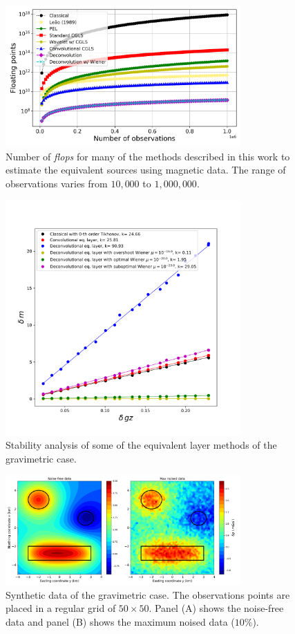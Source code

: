 \begin{figure}[htbp]
	\begin{center}
		\includegraphics[width=9cm]{Fig/flops_mag}%
	\end{center}
	\caption{Number of \textit{flops} for many of the methods described in this work to estimate the equivalent sources using magnetic data. The range of observations varies from $10,000$ to $1,000,000$.}
	\label{fig:2}
\end{figure}

\begin{figure}[htbp]
	\begin{center}
		\includegraphics[width=9cm]{Fig/stability_grav}
	\end{center}
	\caption{Stability analysis of some of the equivalent layer methods of the gravimetric case.}
	\label{fig:3}
\end{figure}

\begin{figure}[htbp]
	\begin{center}
		\includegraphics[width=9cm]{Fig/synthetic_grav}
	\end{center}
	\caption{Synthetic data of the gravimetric case. The observations points are placed in a regular grid of $50 \times 50$. Panel (A) shows the noise-free data and panel (B) shows the maximum noised data ($10\%$).}
	\label{fig:4}
\end{figure}

